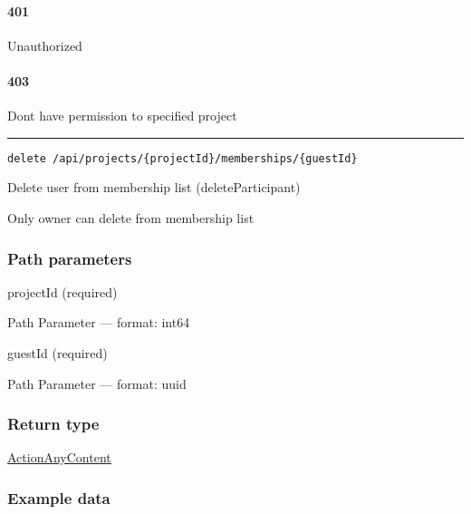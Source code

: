\hypertarget{section-15}{%
\paragraph{401}\label{section-15}}

Unauthorized \protect\hyperlink{}{}

\hypertarget{section-16}{%
\paragraph{403}\label{section-16}}

Dont have permission to specified project \protect\hyperlink{}{}

\begin{center}\rule{0.5\linewidth}{0.5pt}\end{center}

\protect\hypertarget{deleteParticipant}{}{}



\begin{verbatim}
delete /api/projects/{projectId}/memberships/{guestId}
\end{verbatim}

Delete user from membership list ({deleteParticipant})

Only owner can delete from membership list

\hypertarget{path-parameters-3}{%
\subsubsection*{Path parameters}\label{path-parameters-3}}

projectId (required)

{Path Parameter} --- format: int64

guestId (required)

{Path Parameter} --- format: uuid

\hypertarget{return-type-5}{%
\subsubsection*{Return type}\label{return-type-5}}

\protect\hyperlink{ActionAnyContent}{ActionAnyContent}

\hypertarget{example-data-5}{%
\subsubsection*{Example data}\label{example-data-5}}


